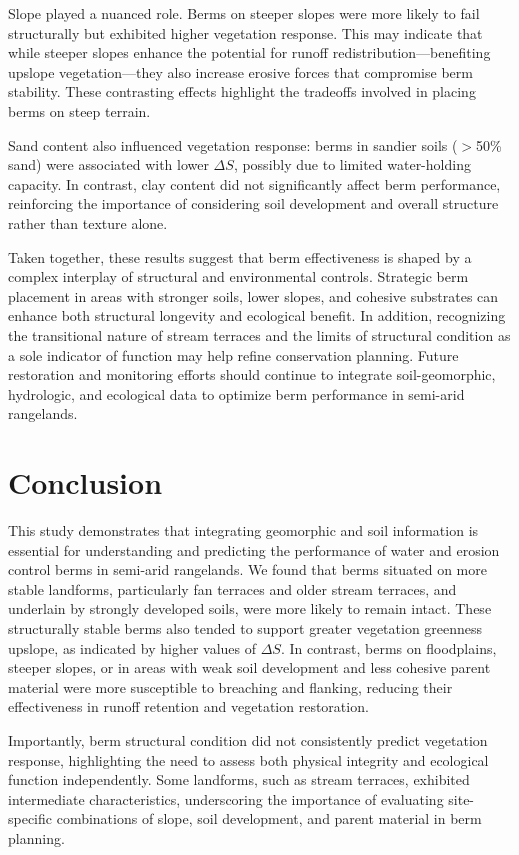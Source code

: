 \documentclass[review]{elsarticle}
\begin{document}
Slope played a nuanced role. Berms on steeper slopes were more likely to fail structurally but exhibited higher vegetation response. This may indicate that while steeper slopes enhance the potential for runoff redistribution—benefiting upslope vegetation—they also increase erosive forces that compromise berm stability. These contrasting effects highlight the tradeoffs involved in placing berms on steep terrain.

Sand content also influenced vegetation response: berms in sandier soils ($>$50\% sand) were associated with lower $\Delta S$, possibly due to limited water-holding capacity. In contrast, clay content did not significantly affect berm performance, reinforcing the importance of considering soil development and overall structure rather than texture alone.

Taken together, these results suggest that berm effectiveness is shaped by a complex interplay of structural and environmental controls. Strategic berm placement in areas with stronger soils, lower slopes, and cohesive substrates can enhance both structural longevity and ecological benefit. In addition, recognizing the transitional nature of stream terraces and the limits of structural condition as a sole indicator of function may help refine conservation planning. Future restoration and monitoring efforts should continue to integrate soil-geomorphic, hydrologic, and ecological data to optimize berm performance in semi-arid rangelands.

\section{Conclusion}

This study demonstrates that integrating geomorphic and soil information is essential for understanding and predicting the performance of water and erosion control berms in semi-arid rangelands. We found that berms situated on more stable landforms, particularly fan terraces and older stream terraces, and underlain by strongly developed soils, were more likely to remain intact. These structurally stable berms also tended to support greater vegetation greenness upslope, as indicated by higher values of $\Delta S$. In contrast, berms on floodplains, steeper slopes, or in areas with weak soil development and less cohesive parent material were more susceptible to breaching and flanking, reducing their effectiveness in runoff retention and vegetation restoration.

Importantly, berm structural condition did not consistently predict vegetation response, highlighting the need to assess both physical integrity and ecological function independently. Some landforms, such as stream terraces, exhibited intermediate characteristics, underscoring the importance of evaluating site-specific combinations of slope, soil development, and parent material in berm planning.
\end{document}
